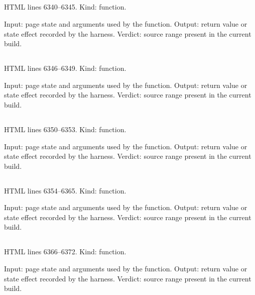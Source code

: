 \subsection*{\texttt{}}
\label{vf_292_ccP}
HTML lines 6340--6345. Kind: function.

Input: page state and arguments used by the function.
Output: return value or state effect recorded by the harness.
Verdict: source range present in the current build.

\subsection*{\texttt{}}
\label{vf_293_ccU}
HTML lines 6346--6349. Kind: function.

Input: page state and arguments used by the function.
Output: return value or state effect recorded by the harness.
Verdict: source range present in the current build.

\subsection*{\texttt{}}
\label{vf_294_ccC}
HTML lines 6350--6353. Kind: function.

Input: page state and arguments used by the function.
Output: return value or state effect recorded by the harness.
Verdict: source range present in the current build.

\subsection*{\texttt{}}
\label{vf_295_ccXbarS}
HTML lines 6354--6365. Kind: function.

Input: page state and arguments used by the function.
Output: return value or state effect recorded by the harness.
Verdict: source range present in the current build.

\subsection*{\texttt{}}
\label{vf_296_ccFunnel}
HTML lines 6366--6372. Kind: function.

Input: page state and arguments used by the function.
Output: return value or state effect recorded by the harness.
Verdict: source range present in the current build.

